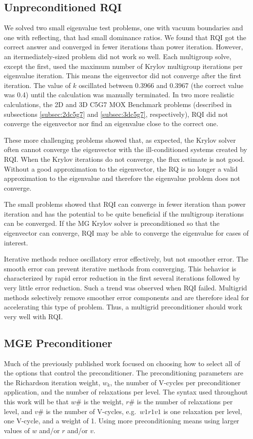 \documentclass[preprint,12pt]{elsarticle}
\begin{document}
\subsection{Unpreconditioned RQI}
We solved two small eigenvalue test problems, one with vacuum boundaries and one with reflecting, that had small dominance ratios. We found that RQI got the correct answer and converged in fewer iterations than power iteration. However, an itermediately-sized problem did not work so well. Each multigroup solve, except the first, used the maximum number of Krylov multigroup iterations per eigenvalue iteration. This means the eigenvector did not converge after the first iteration. The value of $k$ oscillated between 0.3966 and 0.3967 (the correct value was 0.4) until the calculation was manually terminated. In two more realistic calculations, the 2D and 3D C5G7 MOX Benchmark problems (described in subsections \ref{subsec:2dc5g7} and \ref{subsec:3dc5g7}, respectively), RQI did not converge the eigenvector nor find an eigenvalue close to the correct one. 

These more challenging problems showed that, as expected, the Krylov solver often cannot converge the eigenvector with the ill-conditioned systems created by RQI. When the Krylov iterations do not converge, the flux estimate is not good. Without a good approximation to the eigenvector, the RQ is no longer a valid approximation to the eigenvalue and therefore the eigenvalue problem does not converge. 

The small problems showed that RQI can converge in fewer iteration than power iteration and has the potential to be quite beneficial if the multigroup iterations can be converged. If the MG Krylov solver is preconditioned so that the eigenvector can converge, RQI may be able to converge the eigenvalue for cases of interest.

Iterative methods reduce oscillatory error effectively, but not smoother error. The smooth error can prevent iterative methods from converging. This behavior is characterized by rapid error reduction in the first several iterations followed by very little error reduction. Such a trend was observed when RQI failed. Multigrid methods selectively remove smoother error components and are therefore ideal for accelerating this type of problem. Thus, a multigrid preconditioner should work very well with RQI. 

\subsection{MGE Preconditioner}
Much of the previously published work focused on choosing how to select all of the options that control the preconditioner. The preconditioning parameters are the Richardson iteration weight, $w_{k}$, the number of V-cycles per preconditioner application, and the number of relaxations per level. The syntax used throughout this work will be that $w\#$ is the weight, $r\#$ is the number of relaxations per level, and $v\#$ is the number of V-cycles, e.g.\ $w1r1v1$ is one relaxation per level, one V-cycle, and a weight of 1. Using more preconditioning means using larger values of $w$ and/or $r$ and/or $v$. 
\end{document}
